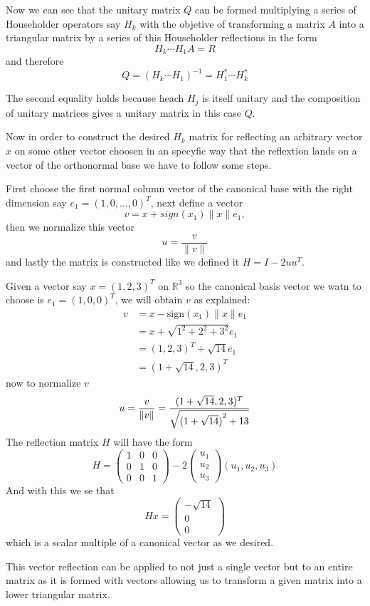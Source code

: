 \documentclass{scrartcl}
\begin{document}
Now we can see that the unitary matrix $Q$ can be formed multiplying a series of Householder operators say $H_k$ with the objetive of transforming a matrix $A$ into a triangular matrix by a series of this Householder reflections in the form
\[
H_k \cdots H_1 A = R
\]
and therefore
\[
Q = (H_k \cdots H_1)^{-1} = H_1^* \cdots H_k^*
\]

The second equality holds because heach $H_j$ is itself unitary and the composition of unitary matrices gives a unitary matrix in this case $Q$.

Now in order to construct the desired $H_k$ matrix for reflecting an arbitrary vector $x$ on some other vector choosen in an specyfic way that the reflextion lands on a vector of the orthonormal base we have to follow some steps.

First choose the first normal column vector of the canonical base with the right dimension say $e_1 = (1, 0, \ldots, 0)^T$, next define a vector
\[
v = x + sign(x_1)\|x\|e_1,
\]
then we normalize this vector
\[
u = \frac{v}{\|v\|}
\]
and lastly the matrix is constructed like we defined it $H = I - 2uu^T$.

\begin{example}
  Given a vector say $x = (1, 2, 3)^T$ on $\mathbb{R}^3$ so the canonical basis vector we watn to choose is $e_1 = (1, 0, 0)^T$, we will obtain $v$ as explained:
\begin{align*}
    v &= x - \text{sign}(x_1)\|x\|e_1 \\
      &= x + \sqrt{1^2 + 2^2 + 3^2}e_1 \\
      &= (1, 2, 3)^T + \sqrt{14}e_1 \\
      &= (1 + \sqrt{14}, 2, 3)^T
\end{align*}
now to normalize $v$
\[
  u = \frac{v}{\|v \|} \\
    = \frac{(1 + \sqrt{14}, 2, 3)^T}{\sqrt{{(1 + \sqrt{14})}^2 + 13}}
\]
The reflection matrix $H$ will have the form
\[
  H = \begin{pmatrix}
    1 & 0 & 0 \\
    0 & 1 & 0 \\
    0 & 0 & 1
    \end{pmatrix} - 2 \begin{pmatrix} u_1 \\ u_2 \\ u_3 \end{pmatrix}
      \left( u_1, u_2, u_3 \right)
\]
And with this we se that
\[
    Hx = \begin{pmatrix} -\sqrt{14} \\ 0 \\ 0 \end{pmatrix}
\]
which is a scalar multiple of a canonical vector as we desired.
\end{example}
This vector reflection can be applied to not just a single vector but to an entire matrix as it is formed with vectors allowing us to transform a given matrix into a lower triangular matrix.
\end{document}
